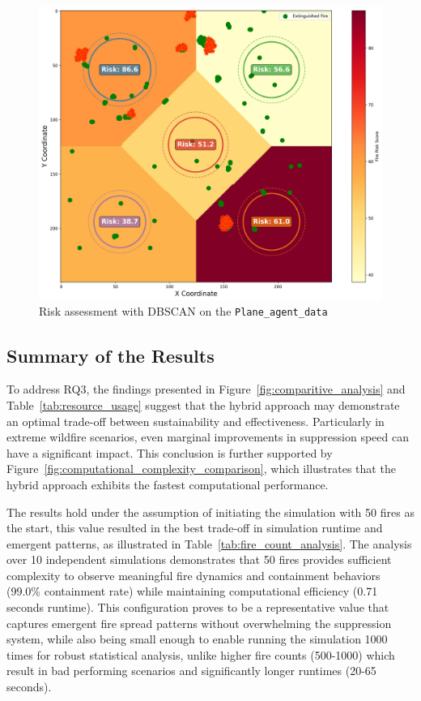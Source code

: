 \documentclass[11pt, a4paper]{article}
\begin{document}
\begin{figure}[!htbp]
    \centering
    \includegraphics[width=1\linewidth]{figures/enhanced_fire_risk_analysis.jpeg}
    \caption{Risk assessment with DBSCAN on the \texttt{Plane\_agent\_data}}
    \label{fig:risk_assesment}
\end{figure}


\subsection{Summary of the Results}

To address RQ3, the findings presented in Figure~\ref{fig:comparitive_analysis} and Table~\ref{tab:resource_usage} suggest that the hybrid approach may demonstrate an optimal trade-off between sustainability and effectiveness. Particularly in extreme wildfire scenarios, even marginal improvements in suppression speed can have a significant impact. This conclusion is further supported by Figure~\ref{fig:computational_complexity_comparison}, which illustrates that the hybrid approach exhibits the fastest computational performance.

The results hold under the assumption of initiating the simulation with 50 fires as the start, this value resulted in the best trade-off in simulation runtime and emergent patterns, as illustrated in Table~\ref{tab:fire_count_analysis}. The analysis over 10 independent simulations demonstrates that 50 fires provides sufficient complexity to observe meaningful fire dynamics and containment behaviors (99.0\% containment rate) while maintaining computational efficiency (0.71 seconds runtime). This configuration proves to be a representative value that captures emergent fire spread patterns without overwhelming the suppression system, while also being small enough to enable running the simulation 1000 times for robust statistical analysis, unlike higher fire counts (500-1000) which result in bad performing scenarios and significantly longer runtimes (20-65 seconds). 
\end{document}
